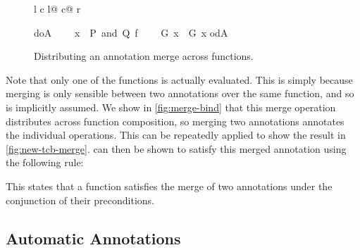 \documentclass[submission]{eptcs}
\newcommand{\isafun}[1]{{\sf #1}}
\begin{document}
\begin{isabellebody}
\begin{isamarkuptext}
\begin{figure}[tb]
\begin{tabular}{l c l@ {\hspace{24 pt}}c@ {\hspace{12 pt}}r}
\begin{minipage}[t]{0.2\textwidth}
\begin{isabelle}\isafun{doA}\isanewline
\ \ \ \ x\ {}\ {}P\ and\ Q{}\ f{}\isanewline
\ \ \ \ G\ x\ {}\ G{}\ x\isanewline
\isafun{odA}\end{isabelle}
\end{minipage}
\end{tabular}
\caption{Distributing an annotation merge across functions.\label{fig:merge-bind}}
\end{figure}
Note that only one of the functions  is actually evaluated.
This is simply because merging is only sensible between
two annotations over the same function, and so
\isa{\isafun{dropA}\ F\ s\ {\isaliteral{3D}{\isacharequal}}\ \isafun{dropA}\ G\ s} is implicitly assumed.
We show in \autoref{fig:merge-bind} that this merge operation distributes
across function composition, so merging two annotations annotates
the individual operations. This can be repeatedly applied to show the result
in \autoref{fig:new-tcb-merge}. \isa{\isafun{new{\isaliteral{5F}{\isacharunderscore}}tcb}}
can then be shown to satisfy this merged annotation
using the following rule:
\begin{center}
 \label{eqn:merge-naf-sub}
\end{center}
This states that a function satisfies the merge of two
annotations under the conjunction of their preconditions.

\subsection*{Automatic Annotations}


\end{isamarkuptext}
\end{isabellebody}
\end{document}
